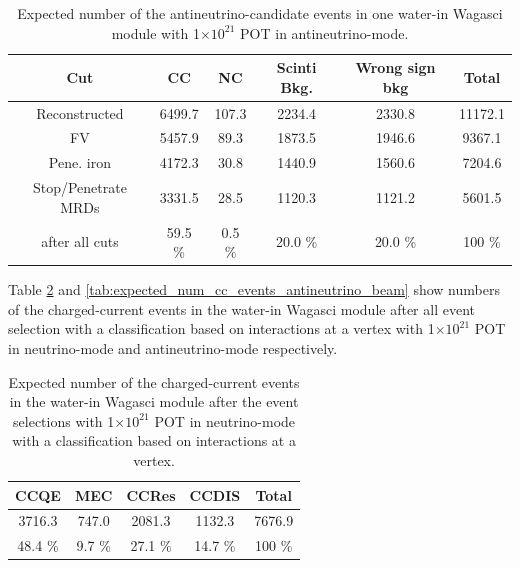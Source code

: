 \begin{table}[htb]
  \begin{center}
    \caption{Expected number of the antineutrino-candidate events in one water-in Wagasci module with 1$\times 10^{21}$ POT in antineutrino-mode.}
    \begin{tabular}{c|cccc|c} \hline
 Cut   & CC & NC & Scinti Bkg. & Wrong sign bkg & Total \\ \hline
Reconstructed & 6499.7 & 107.3 & 2234.4 & 2330.8 & 11172.1 \\ 
FV & 5457.9 & 89.3 & 1873.5 & 1946.6 & 9367.1 \\ 
Pene. iron & 4172.3 & 30.8 & 1440.9 & 1560.6 & 7204.6 \\ 
Stop/Penetrate MRDs & 3331.5 & 28.5 & 1120.3 & 1121.2 & 5601.5 \\ \hline
after all cuts & 59.5 \% & 0.5 \% & 20.0 \% &  20.0 \% & 100 \% \\
\hline
    \end{tabular}
    \label{tab:expected_num_events_antineutrino_beam}
  \end{center}
\end{table}


Table \ref{tab:expected_num_cc_events_neutrino_beam} and \ref{tab:expected_num_cc_events_antineutrino_beam}  show numbers of the charged-current events in the water-in Wagasci module after all event selection with a classification based on interactions at a vertex with 1$\times 10^{21}$ POT in neutrino-mode and antineutrino-mode respectively.

\begin{table}[htb]
  \begin{center}
    \caption{Expected number of the charged-current events in the water-in Wagasci module after the event selections with 1$\times 10^{21}$ POT in neutrino-mode with a classification based on interactions at a vertex.}
    \begin{tabular}{cccc|c} \hline
CCQE & MEC & CCRes & CCDIS & Total \\ \hline
3716.3 & 747.0 & 2081.3 & 1132.3 & 7676.9 \\ \hline
48.4 \% & 9.7 \% & 27.1 \% & 14.7 \% & 100 \% \\
\hline
    \end{tabular}
    \label{tab:expected_num_cc_events_neutrino_beam}
  \end{center}
\end{table}

